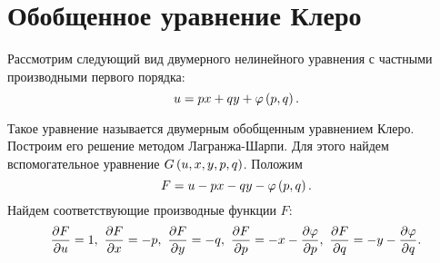 \section{Обобщенное уравнение Клеро}

	Рассмотрим следующий вид двумерного нелинейного уравнения с частными производными первого порядка:
	\[ u = px + qy + \varphi \left( p, q \right). \]

	Такое уравнение называется двумерным обобщенным уравнением Клеро. Построим его решение методом Лагранжа-Шарпи. Для этого найдем вспомогательное уравнение $G \left( u, x, y, p, q \right)$. Положим
	\[ F = u - px - qy - \varphi \left( p, q \right). \]
	Найдем соответствующие производные функции $F$:
	\[ \dfrac{\partial F}{\partial u} = 1 , ~ \dfrac{\partial F}{\partial x} = -p, ~ \dfrac{\partial F}{\partial y} = -q, ~ \dfrac{\partial F}{\partial p} = - x - \dfrac{\partial \varphi}{\partial p}, ~ \dfrac{\partial F}{\partial q} = - y - \dfrac{\partial \varphi}{\partial q}. \]

